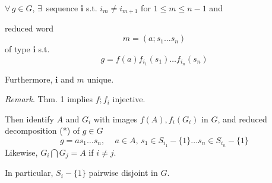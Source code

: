 \begin{theorem}
	$\forall \, g \in G$, $\exists \, $ sequence $\mathbf{i}$ s.t. $i_m \neq i_{m+1}$ for $1\leq m \leq n-1$ and 
	
	reduced word 
	\[
	m = (a;s_1\dots s_n) 
	\]
	of type $\mathbf{i}$ s.t. 
	\[
	g = f(a)f_{i_1}(s_1) \dots f_{i_n}(s_n)
	\]
\end{theorem}

Furthermore, $\mathbf{i}$ and $m$ unique.  

\emph{Remark}.  Thm. 1 implies $f;f_i$ injective.  

Then identify $A$ and $G_i$ with images $f(A), f_i(G_i)$ in $G$, and reduced decomposition (*) of $g\in G$ 
\[
g = as_1\dots s_n, \quad \, a\in A, \, s_1 \in S_{i_1} - \lbrace 1 \rbrace \dots s_n \in S_{i_n} - \lbrace 1 \rbrace
\]
Likewise, $G_i \bigcap G_j = A$ if $i\neq j$.  

In particular, $S_i - \lbrace 1 \rbrace$ pairwise disjoint in $G$.  

